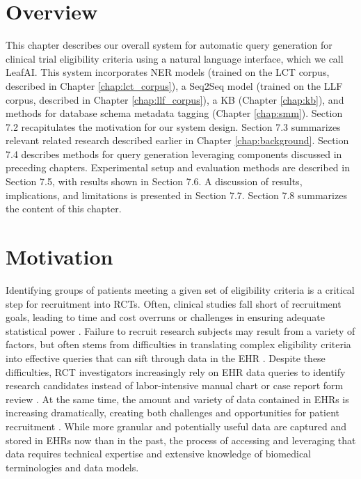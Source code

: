 \documentclass[../main.tex]{subfiles}
\begin{document}
\section{Overview}

This chapter describes our overall system for automatic query generation for clinical trial eligibility criteria using a natural language interface, which we call LeafAI. This system incorporates NER models (trained on the LCT corpus, described in Chapter \ref{chap:lct_corpus}), a Seq2Seq model (trained on the LLF corpus, described in Chapter \ref{chap:llf_corpus}), a KB (Chapter \ref{chap:kb}), and methods for database schema metadata tagging (Chapter \ref{chap:smm}). Section 7.2 recapitulates the motivation for our system design. Section 7.3 summarizes relevant related research described earlier in Chapter \ref{chap:background}. Section 7.4 describes methods for query generation leveraging components discussed in preceding chapters. Experimental setup and evaluation methods are described in Section 7.5, with results shown in Section 7.6. A discussion of results, implications, and limitations is presented in Section 7.7. Section 7.8 summarizes the content of this chapter.

\section{Motivation}

Identifying groups of patients meeting a given set of eligibility criteria is a critical step for recruitment into RCTs. Often, clinical studies fall short of recruitment goals, leading to time and cost overruns or challenges in ensuring adequate statistical power \cite{gul2010clinical, adams2015barriers}. Failure to recruit research subjects may result from a variety of factors, but often stems from difficulties in translating complex eligibility criteria into effective queries that can sift through data in the EHR \cite{wang2017classifying}. Despite these difficulties, RCT investigators increasingly rely on EHR data queries to identify research candidates instead of labor-intensive manual chart or case report form review \cite{cowie2017electronic}. At the same time, the amount and variety of data contained in EHRs is increasing dramatically, creating both challenges and opportunities for patient recruitment \cite{lee2017medical}. While more granular and potentially useful data are captured and stored in EHRs now than in the past, the process of accessing and leveraging that data requires technical expertise and extensive knowledge of biomedical terminologies and data models. 
\end{document}
